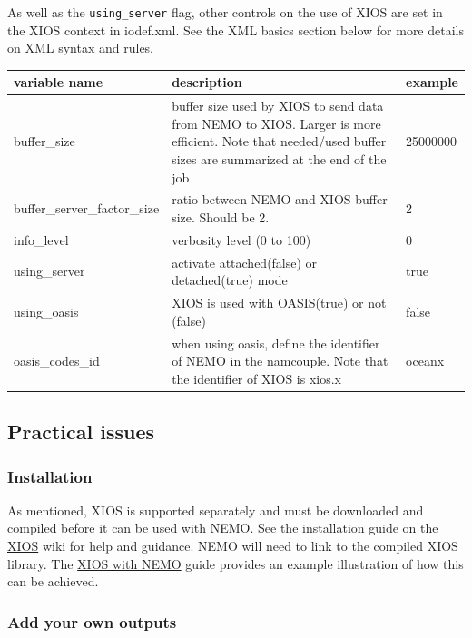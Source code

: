 As well as the {\tt using\_server} flag, other controls on the use of XIOS are set in the XIOS context in iodef.xml. See the XML basics section below for more details on XML syntax and rules.

\begin{tabular}{|p{4cm}|p{6.0cm}|p{2.0cm}|}
   \hline
   variable name & 
   description & 
   example \\ 
   \hline   
   \hline
   buffer\_size & 
   buffer size used by XIOS to send data from NEMO to XIOS. Larger is more efficient. Note that needed/used buffer sizes are summarized at the end of the job & 
   25000000 \\ 
   \hline   
   buffer\_server\_factor\_size & 
   ratio between NEMO and XIOS buffer size. Should be 2. & 
   2 \\ 
   \hline
   info\_level & 
   verbosity level (0 to 100) & 
   0 \\ 
   \hline
   using\_server & 
   activate attached(false) or detached(true) mode & 
   true \\ 
   \hline
   using\_oasis & 
   XIOS is used with OASIS(true) or not (false) & 
   false \\ 
   \hline
   oasis\_codes\_id & 
   when using oasis, define the identifier of NEMO in the namcouple. Note that the identifier of XIOS is xios.x & 
   oceanx \\ 
   \hline   
\end{tabular}


\subsection{Practical issues}

\subsubsection{Installation}

As mentioned, XIOS is supported separately and must be downloaded and compiled before it can be used with NEMO. See the installation guide on the \href{http://forge.ipsl.jussieu.fr/ioserver/wiki}{XIOS} wiki for help and guidance. NEMO will need to link to the compiled XIOS library. The 
\href{http://www.nemo-ocean.eu/Using-NEMO/User-Guides/Basics/XIOS-IO-server-installation-and-use}{XIOS with NEMO} guide provides an example illustration of how this can be achieved.

\subsubsection{Add your own outputs}


